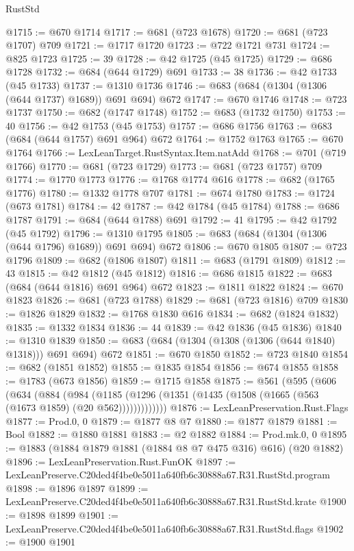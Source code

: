 \begin{lexlean}{RustStd}
\begin{coremodule}
@1715 := @670 @1714
@1717 := @681 (@723 @1678)
@1720 := @681 (@723 @1707) @709
@1721 := @1717 @1720
@1723 := @722 @1721 @731
@1724 := @825 @1723
@1725 := 39
@1728 := @42 @1725 (@45 @1725)
@1729 := @686 @1728
@1732 := @684 (@644 @1729) @691
@1733 := 38
@1736 := @42 @1733 (@45 @1733)
@1737 := @1310 @1736
@1746 := @683 (@684 (@1304 (@1306 (@644 @1737) @1689)) @691 @694) @672
@1747 := @670 @1746
@1748 := @723 @1737
@1750 := @682 (@1747 @1748)
@1752 := @683 (@1732 @1750)
@1753 := 40
@1756 := @42 @1753 (@45 @1753)
@1757 := @686 @1756
@1763 := @683 (@684 (@644 @1757) @691 @964) @672
@1764 := @1752 @1763
@1765 := @670 @1764
@1766 := LexLeanTarget.RustSyntax.Item.natAdd
@1768 := @701 (@719 @1766)
@1770 := @681 (@723 @1729)
@1773 := @681 (@723 @1757) @709
@1774 := @1770 @1773
@1776 := @1768 @1774 @616
@1778 := @682 (@1765 @1776)
@1780 := @1332 @1778 @707
@1781 := @674 @1780
@1783 := @1724 (@673 @1781)
@1784 := 42
@1787 := @42 @1784 (@45 @1784)
@1788 := @686 @1787
@1791 := @684 (@644 @1788) @691
@1792 := 41
@1795 := @42 @1792 (@45 @1792)
@1796 := @1310 @1795
@1805 := @683 (@684 (@1304 (@1306 (@644 @1796) @1689)) @691 @694) @672
@1806 := @670 @1805
@1807 := @723 @1796
@1809 := @682 (@1806 @1807)
@1811 := @683 (@1791 @1809)
@1812 := 43
@1815 := @42 @1812 (@45 @1812)
@1816 := @686 @1815
@1822 := @683 (@684 (@644 @1816) @691 @964) @672
@1823 := @1811 @1822
@1824 := @670 @1823
@1826 := @681 (@723 @1788)
@1829 := @681 (@723 @1816) @709
@1830 := @1826 @1829
@1832 := @1768 @1830 @616
@1834 := @682 (@1824 @1832)
@1835 := @1332 @1834
@1836 := 44
@1839 := @42 @1836 (@45 @1836)
@1840 := @1310 @1839
@1850 := @683 (@684 (@1304 (@1308 (@1306 (@644 @1840) @1318))) @691 @694) @672
@1851 := @670 @1850
@1852 := @723 @1840
@1854 := @682 (@1851 @1852)
@1855 := @1835 @1854
@1856 := @674 @1855
@1858 := @1783 (@673 @1856)
@1859 := @1715 @1858
@1875 := @561
    (@595
      (@606
        (@634
          (@884
            (@984
              (@1185 (@1296 (@1351 (@1435 (@1508 (@1665 (@563 (@1673 @1859) (@20 @562)))))))))))))
@1876 := LexLeanPreservation.Rust.Flags
@1877 := Prod.{0, 0}
@1879 := @1877 @8 @7
@1880 := @1877 @1879
@1881 := Bool
@1882 := @1880 @1881
@1883 := @2 @1882
@1884 := Prod.mk.{0, 0}
@1895 := @1883 (@1884 @1879 @1881 (@1884 @8 @7 @475 @316) @616) (@20 @1882)
@1896 := LexLeanPreservation.Rust.FunOK
@1897 := LexLeanPreserve.C20ded4f4be0e5011a640fb6c30888a67.R31.RustStd.program
@1898 := @1896 @1897
@1899 := LexLeanPreserve.C20ded4f4be0e5011a640fb6c30888a67.R31.RustStd.krate
@1900 := @1898 @1899
@1901 := LexLeanPreserve.C20ded4f4be0e5011a640fb6c30888a67.R31.RustStd.flags
@1902 := @1900 @1901

\end{coremodule}
\end{lexlean}
